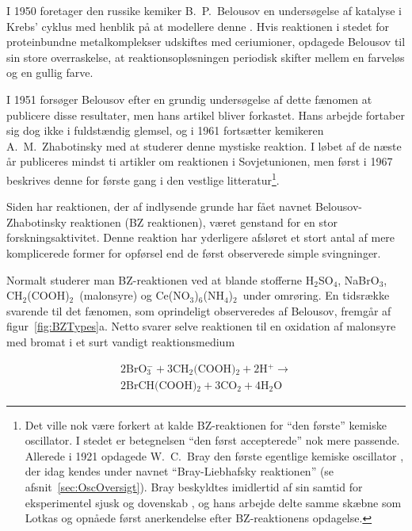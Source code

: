 {
\newcommand{\hso}        {\mbox{H$_2$SO$_4$}}
\newcommand{\malon}      {\mbox{CH$_2$(COOH)$_2$}}
\newcommand{\nabro}      {\mbox{NaBrO$_3$}}
\newcommand{\bromat}     {\mbox{BrO$_3^-$}}
\newcommand{\prot}       {\mbox{H$^+$}}
\newcommand{\brmalon}    {\mbox{BrCH(COOH)$_2$}}
\newcommand{\cotwo}      {\mbox{CO$_2$}}
\newcommand{\ho}         {\mbox{H$_2$O}}
\newcommand{\cesalt}     {\mbox{Ce(NO$_3$)$_6$(NH$_4$)$_2$}}

\vspace{4.0mm}
I 1950 foretager den russike kemiker B.\ P.\ Belousov en
unders{\o}gelse af katalyse i Krebs' cyklus med henblik
p{\aa} at modellere denne \cite{BZ-History}. Hvis
reaktionen i stedet for proteinbundne metalkomplekser
udskiftes med ceriumioner, opdagede Belousov til sin store
overraskelse, at reaktionsopl{\o}sningen periodisk skifter
mellem en farvel{\o}s og en gullig farve.

\vspace{4.0mm}
I 1951 fors{\o}ger Belousov efter en grundig
unders{\o}gelse af dette f{\ae}nomen at publicere disse
resultater, men hans artikel bliver forkastet. Hans arbejde
for\-taber sig dog ikke i fuldst{\ae}ndig glemsel, og i
1961 forts{\ae}tter kemikeren A.\ M.\ Zhabotinsky med at
studerer denne mystiske reaktion. I l{\o}bet af de
n{\ae}ste {\aa}r publiceres mindst ti artikler om
reaktionen i Sovjetunionen, men f{\o}rst i 1967 beskrives
denne for f{\o}rste gang i den vestlige
litteratur\footnote{Det ville nok v{\ae}re forkert at kalde
BZ-reaktionen for ``den f{\o}rste'' kemiske oscillator. I
stedet er betegnelsen ``den f{\o}rst accepterede'' nok mere
passende. Allerede i 1921 opdagede W.\ C.\ Bray den
f{\o}rste egentlige kemiske oscillator \protect\cite{Bray},
der idag kendes under navnet ``Bray-Liebhafsky reaktionen''
(se afsnit~\ref{sec:OscOversigt}). Bray beskyldtes
imidlertid af sin samtid for eksperimentel sjusk og
dovenskab \protect\cite{EpsteinHistory}, og hans arbejde
delte samme sk{\ae}bne som Lotkas og opn{\aa}ede f{\o}rst
anerkendelse efter BZ-reaktionens
opdagelse.}\cite{Degn1,Degn2}.

\vspace{4.0mm}
Siden har reaktionen, der af indlysende grunde har f{\aa}et
navnet Belou\-sov-Zhabotinsky reaktionen (BZ reaktionen),
v{\ae}ret genstand for en stor forsk\-nings\-aktivitet.
Denne reaktion har yderligere afsl{\o}ret et stort antal af
mere komplicerede former for opf{\o}rsel end de f{\o}rst
observerede simple sving\-ninger.

\vspace{4.0mm}
Normalt studerer man BZ-reaktionen ved at blande stofferne
\hso, \nabro, \malon~(ma\-lonsyre) og \cesalt~\-under
omr{\o}ring. En tidsr{\ae}kke svarende til det f{\ae}nomen,
som oprindeligt observeredes af Belousov, fremg{\aa}r af
figur~\ref{fig:BZTypes}a. Netto svarer selve reaktionen til
en oxidation af malonsyre med bromat i et surt vandigt
reaktions\-medium

\begin{eqnarray}
  2 \bromat + 3 \malon + 2 \prot \longrightarrow \nonumber\\
  2 \brmalon + 3 \cotwo + 4 \ho
  \label{eq:BZEquation}
\end{eqnarray}
}

